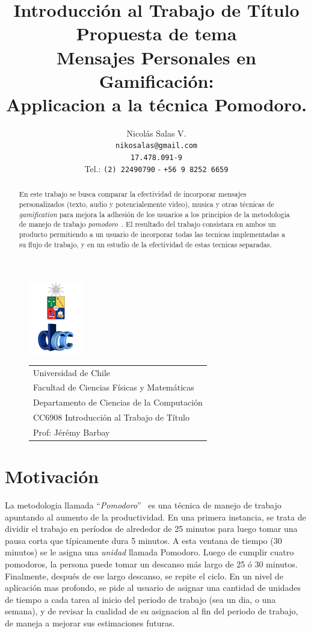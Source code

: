 \documentclass[12pt,letterpaper]{report}
\title{
{\small Introducción al Trabajo de Título \\  Propuesta de tema}
\\
{\Huge 
Mensajes Personales en Gamificación:\\
Applicacion a la técnica  Pomodoro.} 
}
\author{Nicolás Salas V.\\\texttt{nikosalas@gmail.com}\\\texttt{17.478.091-9}\\Tel.: \texttt{(2) 22490790} - \texttt{+56 9 8252 6659}}
\begin{document}
\begin{figure}[t]
\includegraphics[scale=0.83]{logo.png}
\begin{tabular}{l}
\small Universidad de Chile\\
\small Facultad de Ciencias Físicas y Matemáticas\\
\small Departamento de Ciencias de la Computación\\
\small CC6908 Introducción al Trabajo de Título\\
\small Prof: Jérémy Barbay
\vspace{2.3cm}
\end{tabular}
\end{figure}
\maketitle

\begin{abstract}
En este trabajo se busca comparar la efectividad de incorporar mensajes personalizados (texto, audio y potencialemente video), musica y otras técnicas de \emph{gamification} para mejora la adhesión de los usuarios a los principios de la metodologia de manejo de trabajo \emph{pomodoro}~\cite{cirillo2009pomodoro}. El resultado del trabajo consistara en ambos un producto permitiendo a un usuario de incorporar todas las tecnicas implementadas a su flujo de trabajo, y en un estudio de la efectividad de estas tecnicas separadas.
\end{abstract}

\tableofcontents
\newpage

\hypertarget{motivaciuxf3n}{%
\section{Motivación}\label{motivaciuxf3n}}

La metodologia llamada ``\emph{Pomodoro}''~\cite{cirillo2009pomodoro} es una técnica de manejo de trabajo apuntando al aumento de la productividad. En una primera instancia, se trata de dividir el trabajo en períodos de alrededor de 25 minutos para luego tomar una pausa corta que típicamente dura 5 minutos. A esta ventana de tiempo (30 minutos) se le asigna una \emph{unidad} llamada Pomodoro.  Luego de cumplir cuatro pomodoros, la persona puede tomar un descanso más largo de 25 ó 30 minutos. Finalmente, después de ese largo descanso, se repite el ciclo. En un nivel de aplicación mas profondo, se pide al usuario de asignar una cantidad de unidades de tiempo a cada tarea al inicio del periodo de trabajo (sea un dia, o una semana), y de revisar la cualidad de su asignacion al fin del periodo de trabajo, de maneja a mejorar sus estimaciones futuras.
\end{document}
